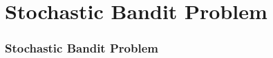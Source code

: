 \documentclass{beamer}
\begin{document}
\section*{Stochastic Bandit Problem}

\begin{frame}
\frametitle{Stochastic Bandit Problem}
\end{frame}


%	


\end{document}
